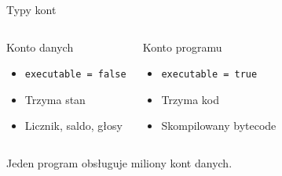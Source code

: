 \begin{frame}{Typy kont}
  \begin{columns}
      \begin{block}{Konto danych}
        \begin{itemize}
          \item \texttt{executable = false}
          \item Trzyma stan
          \item Licznik, saldo, głosy
        \end{itemize}
      \end{block}
      \begin{block}{Konto programu}
        \begin{itemize}
          \item \texttt{executable = true}
          \item Trzyma kod
          \item Skompilowany bytecode
        \end{itemize}
      \end{block}
  \end{columns}
  \vspace{0.3cm}
  \begin{center}
    \textcolor{stplmuted}{Jeden program obsługuje miliony kont danych.}
  \end{center}
\end{frame}


